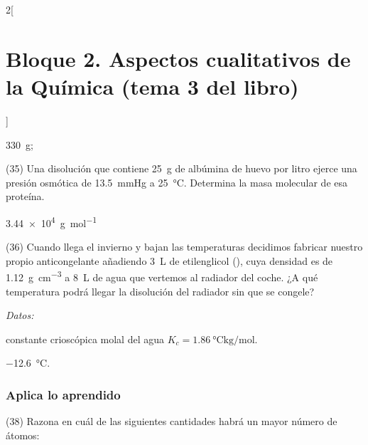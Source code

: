 \documentclass[10pt]{article}
\newenvironment{gexdatos}{
      \vspace{2pt}\noindent\textit{Datos: }
    }{\vspace{5pt}}
\begin{document}
\begin{multicols}{2}[
    \section{Bloque 2. Aspectos cualitativos de la Química (tema 3 del libro)}
  ]
\begin{solution}
  \begin{enumerate*}
    \item \SI{330}{\gram};
    \item {}
  \end{enumerate*}
\end{solution}




\begin{exercise}[
    tags    = {},
    topics  = {química,química básica},
    source  = {FQ 1B MGH 2016, p85, e35},
  ]
  (35) Una disolución que contiene \SI{25}{\gram} de albúmina de
  huevo por litro ejerce una presión osmótica de \SI{13.5}{\mmHg} a
  \SI{25}{\celsius}. Determina la masa molecular de esa proteína.
\end{exercise}

\begin{solution}
  \SI{3.44e4}{\gram\per\mole}
\end{solution}




\begin{exercise}[
    tags    = {},
    topics  = {química,química básica},
    source  = {FQ 1B MGH 2016, p85, e36},
  ]
  (36) Cuando llega el invierno y bajan las temperaturas decidimos fabricar nuestro propio anticongelante añadiendo \SI{3}{\liter} de etilenglicol (), cuya densidad es de \SI{1.12}{\gram\per\cubic\centi\meter} a \SI{8}{\liter} de agua que vertemos al radiador del coche. ¿A qué temperatura podrá llegar la disolución del radiador sin que se congele?

  \begin{gexdatos}
    constante crioscópica molal del agua \( K_c = \SI{1.86}{\celsius\kilo\gram\per\mole} \).
  \end{gexdatos}
\end{exercise}

\begin{solution}
  \SI{-12.6}{\celsius}.
\end{solution}





\subsubsection{Aplica lo aprendido}

\begin{exercise}[
    tags    = {},
    topics  = {química,química básica},
    source  = {FQ 1B MGH 2016, p85, e38},
  ]
  (38) Razona en cuál de las siguientes cantidades habrá un mayor número de átomos:


\end{exercise}
\end{multicols}
\end{document}
